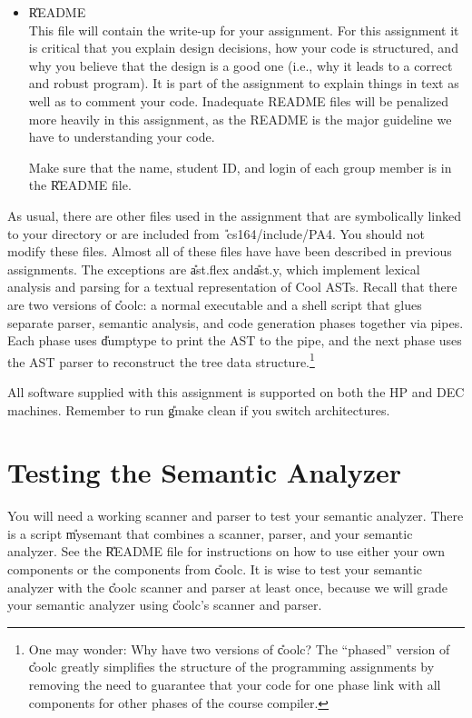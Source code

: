 \begin{itemize}
\item \U{README} \\
This file will contain the write-up for your assignment.  For this
assignment it is critical that you explain design decisions, how your
code is structured, and why you believe that the design is a good one
(i.e., why it leads to a correct and robust program).  It is part of
the assignment to explain things in text as well as to comment your
code.  Inadequate README files will be penalized more heavily in this
assignment, as the README is the major guideline we have to
understanding your code.

Make sure that the name, student ID, and login of each
group member is in the \U{README} file.
\end{itemize}

As usual, there are other files used in the assignment that are symbolically
linked to your directory or are included from \U{~cs164/include/PA4}.
You should not modify these files.
Almost all of these files have have been described in previous assignments.
The exceptions are \U{ast.flex} and\U{ast.y}, which implement
lexical analysis and parsing for a textual representation of Cool ASTs.
Recall that there are two versions of \U{coolc}: a normal executable
and a shell script that glues separate parser, semantic analysis, and
code generation phases together via pipes.  Each phase uses \U{dumptype}
to print the AST to the pipe, and the next phase uses the AST parser
to reconstruct the tree data structure.\footnote{One may wonder: Why
have two versions of \U{coolc}?  The ``phased'' version of
\U{coolc} greatly simplifies the structure of the programming assignments by
removing the need to guarantee that your code for one phase link with all 
components for other phases of the course compiler.}

All software supplied with this assignment is supported on both
the HP and DEC machines.  Remember to run \U{gmake clean} if you switch
architectures. 

\section{Testing the Semantic Analyzer}

You will need a working scanner and parser to test your semantic analyzer.
There is a script \U{mysemant} that combines a scanner, parser,
and your semantic analyzer.
See the \U{README} file for instructions on how to use either your own
components or the components from \U{coolc}.  It is wise to test your
semantic analyzer with the \U{coolc} scanner and parser at least once,
because we will grade your semantic analyzer using \U{coolc}'s scanner
and parser.


